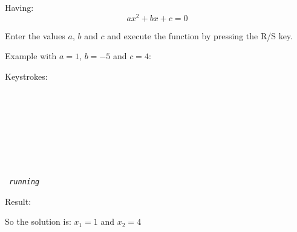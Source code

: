 \documentclass[a4paper, landscape]{article}
\begin{document}
Having:
$$ a x^2 + b x + c = 0 $$ 

\bigskip

Enter the values $a$, $b$ and $c$ and execute the function by pressing the R/S key.

\bigskip
Example with  $a = 1$, $ b = -5$ and $c = 4$:

\bigskip
Keystrokes: \\
\tt
\indent {} \\
\indent \ENTERtfc \\
\indent {} \\
\indent \CHStfc \\
\indent \ENTERtfc \\
\indent {} \\
\indent \RStfc \\
\\
\indent \it { running }
\rm

\bigskip
Result:
\XswapYtfc
{}

\bigskip
So the solution is: $x_1 = 1$ and $x_2 = 4$

\bigskip
\end{document}
